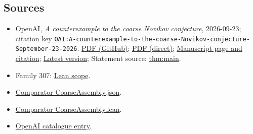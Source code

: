 \documentclass[11pt]{article}
\begin{document}
\subsection{Sources}
\begin{itemize}
\item OpenAI, \emph{A counterexample to the coarse Novikov conjecture}, 2026-09-23; citation key \texttt{OAI:A-counterexample-to-the-coarse-Novikov-conjecture-September-23-2026}. \href{https://github.com/openai/math/blob/adc7f1241b42e322a6451854ab7e4b4c146bf78a/preprints/A-counterexample-to-the-coarse-Novikov-conjecture-September-23-2026/paper.pdf}{PDF (GitHub)}; \href{https://github.com/openai/math/raw/adc7f1241b42e322a6451854ab7e4b4c146bf78a/preprints/A-counterexample-to-the-coarse-Novikov-conjecture-September-23-2026/paper.pdf}{PDF (direct)}; \href{https://github.com/openai/math/blob/adc7f1241b42e322a6451854ab7e4b4c146bf78a/preprints/A-counterexample-to-the-coarse-Novikov-conjecture-September-23-2026/README.md}{Manuscript page and citation}; \href{https://github.com/openai/math/blob/main/preprints/A-counterexample-to-the-coarse-Novikov-conjecture-September-23-2026/paper.pdf}{Latest version}; Statement source: \href{https://github.com/openai/math/blob/adc7f1241b42e322a6451854ab7e4b4c146bf78a/preprints/A-counterexample-to-the-coarse-Novikov-conjecture-September-23-2026/build/sections/01-introduction.tex\#L49}{thm:main}.
\item Family 307: \href{https://github.com/openai/math/blob/adc7f1241b42e322a6451854ab7e4b4c146bf78a/lean/docs/307.md}{Lean scope}.
\item \href{https://github.com/openai/math/blob/adc7f1241b42e322a6451854ab7e4b4c146bf78a/lean/ComparatorChallenges/CoarseAssembly.json}{Comparator CoarseAssembly.json}.
\item \href{https://github.com/openai/math/blob/adc7f1241b42e322a6451854ab7e4b4c146bf78a/lean/ComparatorChallenges/CoarseAssembly.lean}{Comparator CoarseAssembly.lean}.
\item \href{https://github.com/openai/math/blob/adc7f1241b42e322a6451854ab7e4b4c146bf78a/CONTENTS.md}{OpenAI catalogue entry}.
\end{itemize}
\end{document}

